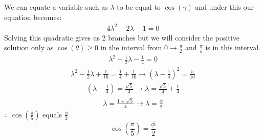\documentclass{article}
\begin{document}
We can equate a variable such as $\lambda$ to be equal to $\cos{(\gamma)}$ and under this our equation becomes:
\begin{eqnarray}
4\lambda^{2} - 2\lambda -1 = 0\nonumber
\end{eqnarray}
\newpage
\noindent Solving this quadratic gives us 2 branches but we will consider the positive solution only as $\cos{(\theta)}\geq0$ in the interval from $0\to\frac{\pi}{2}$ and $\frac{\pi}{5}$ is in this interval. 
\begin{eqnarray}
\lambda^2 - \frac{1}{2}\lambda - \frac{1}{4} = 0\nonumber
\end{eqnarray}
\begin{eqnarray}
\lambda^2 - \frac{1}{2}\lambda +\frac{1}{16} = \frac{1}{4} + \frac{1}{16}\to
\left(\lambda-\frac{1}{4}\right)^{2} = \frac{5}{16}\nonumber
\end{eqnarray}
\begin{eqnarray}
\left(\lambda-\frac{1}{4}\right) = \frac{\sqrt{5}}{4} \to
\lambda = \frac{\sqrt{5}}{4} + \frac{1}{4}\nonumber
\end{eqnarray}
\begin{eqnarray}
\lambda = \frac{1+\sqrt{5}}{4} \to \lambda = \frac{\phi}{2}\nonumber
\end{eqnarray}
$\therefore$ $\cos{(\frac{\pi}{5})}$ equals $\frac{\phi}{2}$\newline
\newpage
\Huge
\begin{equation}
    \cos{\left(\frac{\pi}{5}\right)} = \frac{\phi}{2} \nonumber
\end{equation}
\end{document}
